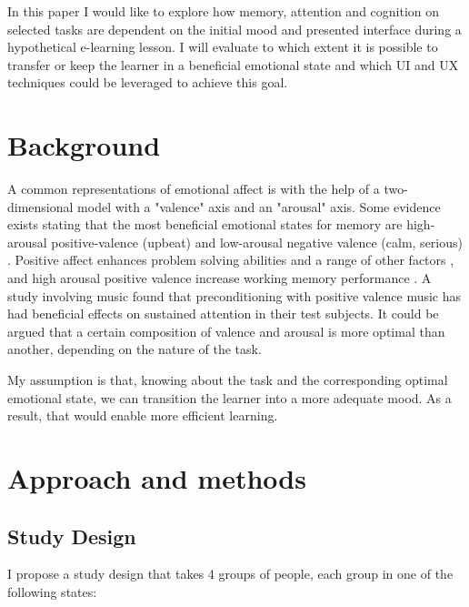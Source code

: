 In this paper I would like to explore how memory, attention and cognition on selected tasks are dependent on the initial mood and presented interface during a hypothetical e-learning lesson. 
I will evaluate to which extent it is possible to transfer or keep the learner in a beneficial emotional state and which UI and UX techniques could be leveraged to achieve this goal.


\section{Background}

A common representations of emotional affect is with the help of a two-dimensional model with a "valence" axis and an "arousal" axis.
Some evidence exists stating that the most beneficial emotional states for memory are high-arousal positive-valence (upbeat) and low-arousal negative valence (calm, serious) \cite[p.~10]{Greene2010}. Positive affect enhances problem solving abilities and a range of other factors \cite{Isen2001}, and high arousal positive valence increase working memory performance \cite{Gabana2017}.
A study \cite{Baldwin2017} involving music found that preconditioning with positive valence music has had beneficial effects on sustained attention in their test subjects.
It could be argued that a certain composition of valence and arousal is more optimal than another, depending on the nature of the task.


My assumption is that, knowing about the task and the corresponding optimal emotional state, we can transition the learner into a more adequate mood. As a result, that would enable more efficient learning.

\section{Approach and methods}

\subsection{Study Design}

I propose a study design that takes 4 groups of people, each group in one of the following states:

